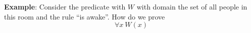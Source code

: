 
{\bf Example}: Consider the predicate with $W$ with domain the set of all people in 
this room and the rule ``is awake''. How do we prove
\[
    \forall x~W(x)
\]
